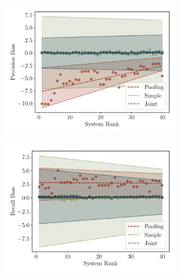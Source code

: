 \begin{figure}
  \begin{subfigure}{0.49\textwidth}
    \centering
    \includegraphics[width=\textwidth]{figures/simulation/simulation-p}
    \caption{}
  \end{subfigure}
  \hfill
  \begin{subfigure}{0.49\textwidth}
    \centering
    \includegraphics[width=\textwidth]{figures/simulation/simulation-r}
    \caption{}
  \end{subfigure} \\



\end{figure}
